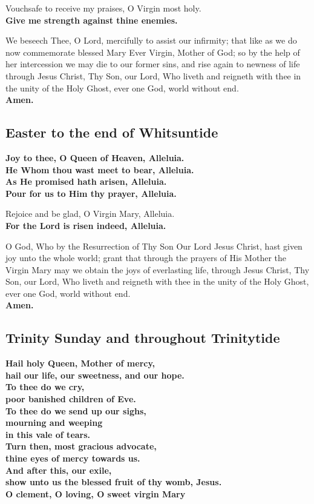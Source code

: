Vouchsafe to receive my praises, O Virgin most holy.\\
\textbf{Give me strength against thine enemies.}

We beseech Thee, O Lord, mercifully to assist our infirmity;
that like as we do now commemorate blessed Mary Ever Virgin, Mother of God;
so by the help of her intercession we may die to our former sins, and rise again to newness of life
through Jesus Christ, Thy Son, our Lord, Who liveth and reigneth with thee in the unity of the Holy Ghost, ever one God, world without end.\\
\textbf{Amen.}

\subsection{Easter to the end of Whitsuntide}

\textbf{Joy to thee, O Queen of Heaven, Alleluia.\\
He Whom thou wast meet to bear, Alleluia.\\
As He promised hath arisen, Alleluia.\\
Pour for us to Him thy prayer, Alleluia.}

Rejoice and be glad, O Virgin Mary, Alleluia.\\
\textbf{For the Lord is risen indeed, Alleluia.}

O God, Who by the Resurrection of Thy Son Our Lord Jesus Christ, hast given
joy unto the whole world; grant that through the prayers of His Mother the Virgin
Mary may we obtain the joys of everlasting life,
through Jesus Christ, Thy Son, our Lord, Who liveth and reigneth with thee in the unity of the Holy Ghost, ever one God, world without end.\\
\textbf{Amen.}

\subsection{Trinity Sunday and throughout Trinitytide}

\textbf{Hail holy Queen, Mother of mercy,\\
hail our life, our sweetness, and our hope.\\
To thee do we cry,\\
poor banished children of Eve.\\
To thee do we send up our sighs,\\
mourning and weeping\\
in this vale of tears.\\
Turn then, most gracious advocate,\\
thine eyes of mercy towards us.\\
And after this, our exile,\\
show unto us the blessed fruit of thy womb, Jesus.\\
O clement, O loving, O sweet virgin Mary}

